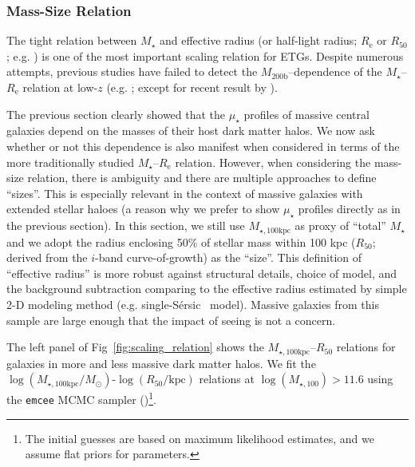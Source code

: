\documentclass[a4paper,fleqn,usenatbib]{mnras}
\def\ser{{S\'{e}rsic\ }}
\def\mstar{{$M_{\star}$}}
\def\mhalo{{$M_{\mathrm{200b}}$}}
\def\mtot{{$M_{\star,100\mathrm{kpc}}$}}
\def\logmtot{{$\log (M_{\star,100\mathrm{kpc}}/M_{\odot})$}}
\def\mden{{$\mu_{\star}$}}
\begin{document}
\subsubsection{Mass-Size Relation}
    \label{sssec:mass_size}
    
    The tight relation between \mstar{} and effective radius (or half-light radius; 
    $R_{\mathrm{e}}$ or $R_{\mathrm{50}}$; e.g. \citealt{Shankar2013, Leja2013, 
    vdWel2014}) is one of the most important scaling relation for ETGs. 
    Despite numerous attempts, previous studies have failed to detect the 
    \mhalo{}--dependence of the \mstar{}--$R_{\mathrm{e}}$ relation at low-$z$ 
    (e.g. \citealt{Weinmann2009, Nair2010, HCompany13, Cerbrian2014}; 
    except for recent result by \citealt{Yoon2017}). 
    
    The previous section clearly showed that the \mden{} profiles of massive central 
    galaxies depend on the masses of their host dark matter halos. 
    We now ask whether or not this dependence is also manifest when considered in 
    terms of the more traditionally studied \mstar{}--$R_{\mathrm{e}}$ relation. 
    However, when considering the mass-size relation, there is ambiguity and there are
    multiple approaches to define ``sizes''. 
    This is especially relevant in the context of massive galaxies with extended 
    stellar haloes (a reason why we prefer to show \mden{} profiles directly as in 
    the previous section). 
    In this section, we still use \mtot{} as proxy of ``total'' \mstar{} and we adopt 
    the radius enclosing 50\% of stellar mass within 100 kpc ($R_{\mathrm{50}}$; 
    derived from the $i$-band curve-of-growth) as the ``size''. 
    This definition of ``effective radius'' is more robust against structural details, 
    choice of model, and the background subtraction comparing to the effective radius 
    estimated by simple 2-D modeling method (e.g. single-\ser{} model). 
    Massive galaxies from this sample are large enough that the impact of seeing is 
    not a concern.
    
    The left panel of Fig~\ref{fig:scaling_relation} shows the 
    \mtot{}--$R_{\mathrm{50}}$ relations for galaxies in more and less massive
    dark matter halos. 
    We fit the \logmtot{}-$\log (R_{\mathrm{50}}/\mathrm{kpc})$ relations at 
    $\log(M_{\star,100})>11.6$ using the \texttt{emcee} MCMC sampler 
    (\citealt{Emcee})\footnote{The initial guesses are based on maximum 
    likelihood estimates, and we assume flat priors for parameters.}.
    
\end{document}
